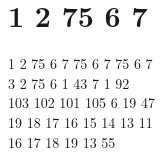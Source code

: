 \section{1 2 75 6 7}
1 2 75 6 7 75 6 7 75 6 7\\
3 2 75 6 1 43 7 1 92\\
103 102 101 105 6 19 47\\
19 18 17 16 15 14 13 11\\
16 17 18 19 13 55\\